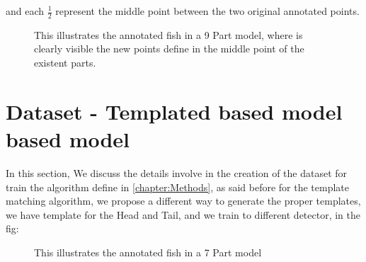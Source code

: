 and each $\frac{1}{2}$ represent the middle point between the two original annotated
points.

\begin{figure}
\begin{adjustwidth}{-1in}{-1in} 
\label{fig:anotated1}
\centering     %
{}
\caption{This illustrates the annotated fish in a 9 Part model, where is clearly visible
the new points define in the middle point of the existent parts.}
\end{adjustwidth}
\end{figure}

 \section{Dataset - Templated based model based model}
 In this section, We discuss the details involve in the creation of the dataset for
 train the algorithm define in \ref{chapter:Methods}, as said before for the template matching algorithm, we propose a different way to generate the proper templates, we have template for the Head and Tail, and we train to different detector, in the fig:

\begin{figure}
\begin{adjustwidth}{-1in}{-1in} 
\label{fig:head_1}
\centering     %
{}
\caption{This illustrates the annotated fish in a 7 Part model}
\end{adjustwidth}
\end{figure}

